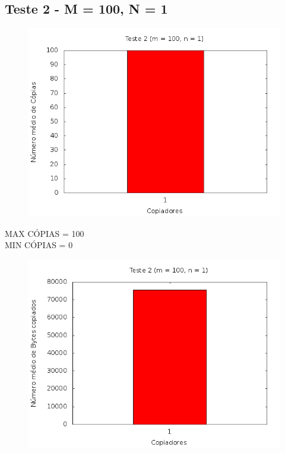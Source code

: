 \documentclass[12pt,a4paper]{article}
\begin{document}
\pagebreak
\subsection{Teste 2 - M = 100, N = 1}
\begin{center}
\begin{figure}[H]
    \center
    \includegraphics[scale=0.5]{imagens/grafico_copias2.png}
    \label{teste2_copias}
\end{figure}
\end{center}

MAX CÓPIAS = 100
\\
MIN CÓPIAS = 0

\begin{center}
\begin{figure}[H]
    \center
    \includegraphics[scale=0.5]{imagens/grafico_bytes2.png}
    \label{teste2_bytes}
\end{figure}
\end{center}
\end{document}
